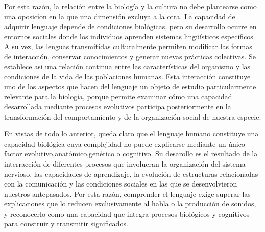 \documentclass[12pt]{article}
\begin{document}
Por esta razón, la relación entre la biología y la cultura no debe plantearse como una oposicíon en la que una dimensión excluya a la otra. La capacidad de adquirir lenguaje depende de condiciones biológicas, pero su desarrollo ocurre en entornos sociales donde los individuos aprenden sistemas lingüísticos específicos. A su vez, las lenguas transmitidas culturalmente permiten modificar las formas de interacción, conservar conocimientos y generar nuevas prácticas colectivas. Se establece asi una relación continua entre las características del organismo y las condiciones de la vida de las poblaciones humanas. Esta interacción constituye uno de los aspectos que hacen del lenguaje un objeto de estudio particularmente relevante para la biología, porque permite examinar cómo una capacidad desarrollada mediante procesos evolutivos participa posteriormente en la transformación del comportamiento y de la organización social de nuestra especie.

En vistas de todo lo anterior, queda claro que el lenguaje humano constituye una capacidad biológica cuya complejidad no puede explicarse mediante un único factor evolutivo,anatómico,genético o cognitivo. Su desarollo  es el resultado de la interracción de diferentes  procesos que involucran la organización  del sistema nervioso, las capacidades de aprendizaje, la evolución de estructuras relacionadas con la comunicación  y las condiciones  sociales en las que se desenvolvieron nuestros antepasados. Por esta razón, comprender el lenguaje exige superar las explicaciones  que lo reducen  exclusivamente al habla o la producción de sonidos, y reconocerlo como una capacidad que integra procesos biológicos y cognitivos  para construir y transmitir significados.
\end{document}

